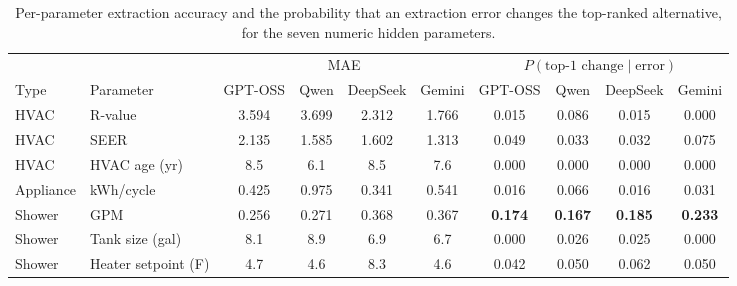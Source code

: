 \documentclass[final,3p,times]{elsarticle}
\begin{document}
\begin{table}[htbp]
\centering
\begin{threeparttable}
\footnotesize
\centering
\renewcommand{\arraystretch}{1.15}
\setlength{\tabcolsep}{4pt}
\begin{tabular}{llcccccccc}
\toprule
 & & \multicolumn{4}{c}{MAE} & \multicolumn{4}{c}{$P(\text{top-1 change} \mid \text{error})$} \\
\cmidrule(lr){3-6}\cmidrule(lr){7-10}
Type & Parameter & GPT-OSS & Qwen & DeepSeek & Gemini & GPT-OSS & Qwen & DeepSeek & Gemini \\
\midrule
HVAC & R-value & 3.594 & 3.699 & 2.312 & 1.766 & 0.015 & 0.086 & 0.015 & 0.000 \\
HVAC & SEER & 2.135 & 1.585 & 1.602 & 1.313 & 0.049 & 0.033 & 0.032 & 0.075 \\
HVAC & HVAC age (yr) & 8.5 & 6.1 & 8.5 & 7.6 & 0.000 & 0.000 & 0.000 & 0.000 \\
Appliance & kWh/cycle & 0.425 & 0.975 & 0.341 & 0.541 & 0.016 & 0.066 & 0.016 & 0.031 \\
Shower & GPM & 0.256 & 0.271 & 0.368 & 0.367 & \textbf{0.174} & \textbf{0.167} & \textbf{0.185} & \textbf{0.233} \\
Shower & Tank size (gal) & 8.1 & 8.9 & 6.9 & 6.7 & 0.000 & 0.026 & 0.025 & 0.000 \\
Shower & Heater setpoint (\textdegree{}F) & 4.7 & 4.6 & 8.3 & 4.6 & 0.042 & 0.050 & 0.062 & 0.050 \\
\bottomrule
\end{tabular}
\setlength{\tabcolsep}{6pt}
\renewcommand{\arraystretch}{1.0}
\end{threeparttable}
\caption{Per-parameter extraction accuracy and the probability that an extraction error changes the top-ranked alternative, for the seven numeric hidden parameters.}
\label{tab:extraction_accuracy}
\end{table}
\end{document}
